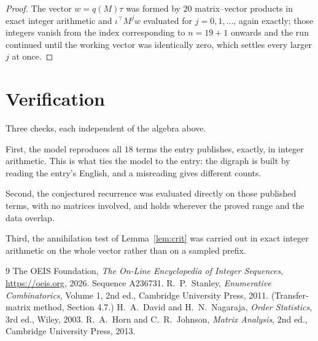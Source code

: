 \documentclass[11pt,a4paper]{article}
\theoremstyle{plain}
\theoremstyle{definition}
\begin{document}
\begin{proof}
The vector $w=q(M)\tau$ was formed by $20$ matrix--vector products in exact integer
arithmetic and $\iota^{\!\top}M^{j}w$ evaluated for $j=0,1,\dots$, again exactly; those
integers vanish from the index corresponding to $n=19+1$ onwards and the run continued
until the working vector was identically zero, which settles every larger $j$ at once.
\end{proof}

\section{Verification}

Three checks, each independent of the algebra above.

First, the model reproduces all $18$ terms the entry publishes, exactly, in integer
arithmetic. This is what ties the model to the entry: the digraph is built by reading the
entry's English, and a misreading gives different counts.

Second, the conjectured recurrence was evaluated directly on those published terms, with no
matrices involved, and holds wherever the proved range and the data overlap.

Third, the annihilation test of Lemma~\ref{lem:crit} was carried out in exact integer
arithmetic on the whole vector rather than on a sampled prefix.

\begin{thebibliography}{9}
 The OEIS Foundation, \emph{The On-Line Encyclopedia of Integer
Sequences}, \url{https://oeis.org}, 2026. Sequence A236731.
 R.~P.~Stanley, \emph{Enumerative Combinatorics}, Volume 1, 2nd ed.,
Cambridge University Press, 2011. (Transfer-matrix method, Section 4.7.)
 H.~A.~David and H.~N.~Nagaraja, \emph{Order Statistics}, 3rd ed., Wiley,
2003.
 R.~A.~Horn and C.~R.~Johnson, \emph{Matrix Analysis}, 2nd ed., Cambridge
University Press, 2013.
\end{thebibliography}
\end{document}
